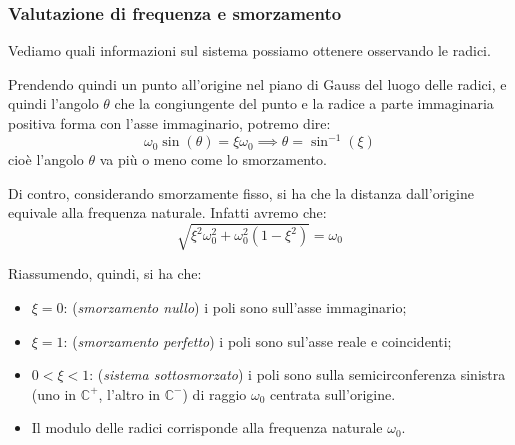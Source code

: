 \documentclass[a4paper,11pt]{article}
\begin{document}
\subsubsection{Valutazione di frequenza e smorzamento}

Vediamo quali informazioni sul sistema possiamo ottenere osservando le radici.

Prendendo quindi un punto all'origine nel piano di Gauss del luogo delle radici, e quindi l'angolo $\theta$ che la congiungente del punto e la radice a parte immaginaria positiva forma con l'asse immaginario, potremo dire:
$$
\omega_0 \sin(\theta) = \xi \omega_0 \implies \theta = \sin^{-1} (\xi) 
$$
cioè l'angolo $\theta$ va più o meno come lo smorzamento.

Di contro, considerando smorzamente fisso, si ha che la distanza dall'origine equivale alla frequenza naturale.
Infatti avremo che:
$$
\sqrt{ \xi^2 \omega_0^2 + \omega_0^2 (1 - \xi^2) } = \omega_0
$$

Riassumendo, quindi, si ha che:
\begin{itemize}
	\item $\xi = 0$: (\textit{smorzamento nullo}) i poli sono sull'asse immaginario;
	\item $\xi = 1$: (\textit{smorzamento perfetto})  i poli sono sul'asse reale e coincidenti;
	\item $0 < \xi < 1$: (\textit{sistema sottosmorzato}) i poli sono sulla semicirconferenza sinistra (uno in $\mathbb{C}^+$, l'altro in $\mathbb{C}^-$) di raggio $\omega_0$ centrata sull'origine.
	\item Il modulo delle radici corrisponde alla frequenza naturale $\omega_0$.
\end{itemize}
\end{document}
